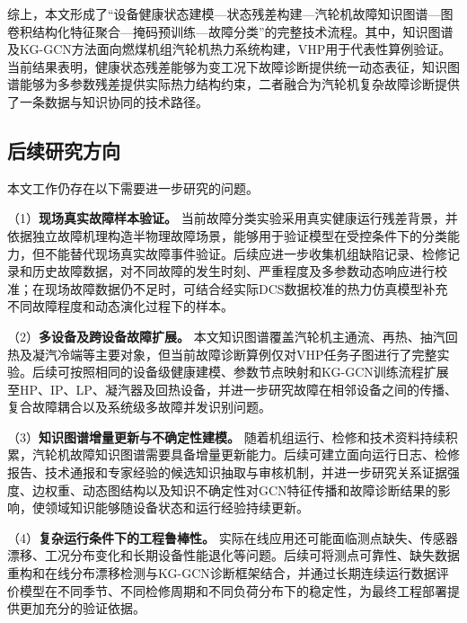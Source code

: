 综上，本文形成了“设备健康状态建模—状态残差构建—汽轮机故障知识图谱—图卷积结构化特征聚合—掩码预训练—故障分类”的完整技术流程。其中，知识图谱及KG-GCN方法面向燃煤机组汽轮机热力系统构建，VHP用于代表性算例验证。当前结果表明，健康状态残差能够为变工况下故障诊断提供统一动态表征，知识图谱能够为多参数残差提供实际热力结构约束，二者融合为汽轮机复杂故障诊断提供了一条数据与知识协同的技术路径。

\subsection{后续研究方向}

本文工作仍存在以下需要进一步研究的问题。

（1）\textbf{现场真实故障样本验证。} 当前故障分类实验采用真实健康运行残差背景，并依据独立故障机理构造半物理故障场景，能够用于验证模型在受控条件下的分类能力，但不能替代现场真实故障事件验证。后续应进一步收集机组缺陷记录、检修记录和历史故障数据，对不同故障的发生时刻、严重程度及多参数动态响应进行校准；在现场故障数据仍不足时，可结合经实际DCS数据校准的热力仿真模型补充不同故障程度和动态演化过程下的样本。

（2）\textbf{多设备及跨设备故障扩展。} 本文知识图谱覆盖汽轮机主通流、再热、抽汽回热及凝汽冷端等主要对象，但当前故障诊断算例仅对VHP任务子图进行了完整实验。后续可按照相同的设备级健康建模、参数节点映射和KG-GCN训练流程扩展至HP、IP、LP、凝汽器及回热设备，并进一步研究故障在相邻设备之间的传播、复合故障耦合以及系统级多故障并发识别问题。

（3）\textbf{知识图谱增量更新与不确定性建模。} 随着机组运行、检修和技术资料持续积累，汽轮机故障知识图谱需要具备增量更新能力。后续可建立面向运行日志、检修报告、技术通报和专家经验的候选知识抽取与审核机制，并进一步研究关系证据强度、边权重、动态图结构以及知识不确定性对GCN特征传播和故障诊断结果的影响，使领域知识能够随设备状态和运行经验持续更新。

（4）\textbf{复杂运行条件下的工程鲁棒性。} 实际在线应用还可能面临测点缺失、传感器漂移、工况分布变化和长期设备性能退化等问题。后续可将测点可靠性、缺失数据重构和在线分布漂移检测与KG-GCN诊断框架结合，并通过长期连续运行数据评价模型在不同季节、不同检修周期和不同负荷分布下的稳定性，为最终工程部署提供更加充分的验证依据。

